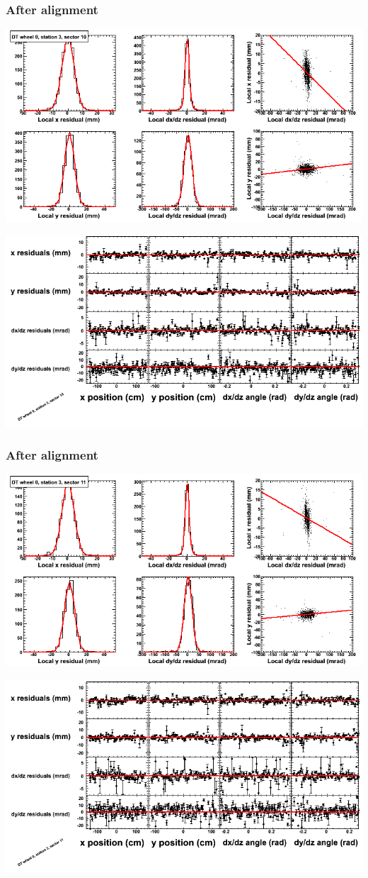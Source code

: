 \documentclass[compress]{beamer}
\begin{document}
\begin{frame}
\frametitle{After alignment}
\includegraphics[width=0.7\linewidth]{NOV4_fitfunctions/MBwhCst3sec10_bellcurves.png}

\includegraphics[width=0.7\linewidth]{NOV4_fitfunctions/MBwhCst3sec10_polynomials.png}
\end{frame}

\begin{frame}
\frametitle{After alignment}
\includegraphics[width=0.7\linewidth]{NOV4_fitfunctions/MBwhCst3sec11_bellcurves.png}

\includegraphics[width=0.7\linewidth]{NOV4_fitfunctions/MBwhCst3sec11_polynomials.png}
\end{frame}
\end{document}
